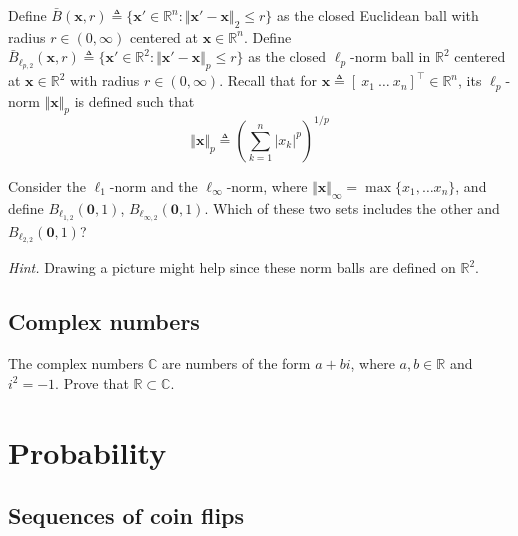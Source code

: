 \documentclass{article}
\numberwithin{equation}{section}
\begin{document}
Define $ \bar{B}(\mathbf{x}, r) \triangleq \{\mathbf{x}' \in \mathbb{R}^n :
\Vert\mathbf{x}' - \mathbf{x}\Vert_2 \le r\} $ as the closed Euclidean ball
with radius $ r \in (0, \infty) $ centered at $ \mathbf{x} \in \mathbb{R}^n $.
Define $ \bar{B}_{\ell_{p, 2}}(\mathbf{x}, r) \triangleq \{\mathbf{x}' \in
\mathbb{R}^2 : \Vert\mathbf{x}' - \mathbf{x}\Vert_p \le r\} $ as the closed
$ \ell_p $-norm ball in $ \mathbb{R}^2 $ centered at $ \mathbf{x}
\in \mathbb{R}^2 $ with radius $ r \in (0, \infty) $. Recall that for
$ \mathbf{x} \triangleq [ \ x_1 \ \ldots \ x_n ]^\top \in \mathbb{R}^n $, its
$ \ell_p $-norm $ \Vert\mathbf{x}\Vert_p $ is defined such that
\begin{equation*}
    \Vert\mathbf{x}\Vert_p \triangleq
    \left(\sum_{k = 1}^n|x_k|^p\right)^{1 / p}
\end{equation*}

Consider the $ \ell_1 $-norm and the $ \ell_\infty $-norm, where
$ \Vert\mathbf{x}\Vert_\infty = \max\{x_1, \ldots x_n\} $, and define
$ B_{\ell_{1, 2}}(\mathbf{0}, 1) $, $ B_{\ell_{\infty, 2}}(\mathbf{0}, 1) $.
Which of these two sets includes the other and
$ B_{\ell_{2, 2}}(\mathbf{0}, 1) $?

\medskip

\textit{Hint.} Drawing a picture might help since these norm balls are
defined on $ \mathbb{R}^2 $.

\subsection{Complex numbers}

The complex numbers $ \mathbb{C} $ are numbers of the form $ a + bi $, where
$ a, b \in \mathbb{R} $ and $ i^2 = -1 $. Prove that
$ \mathbb{R} \subset \mathbb{C} $.

\section{Probability}

\subsection{Sequences of coin flips}
\end{document}
